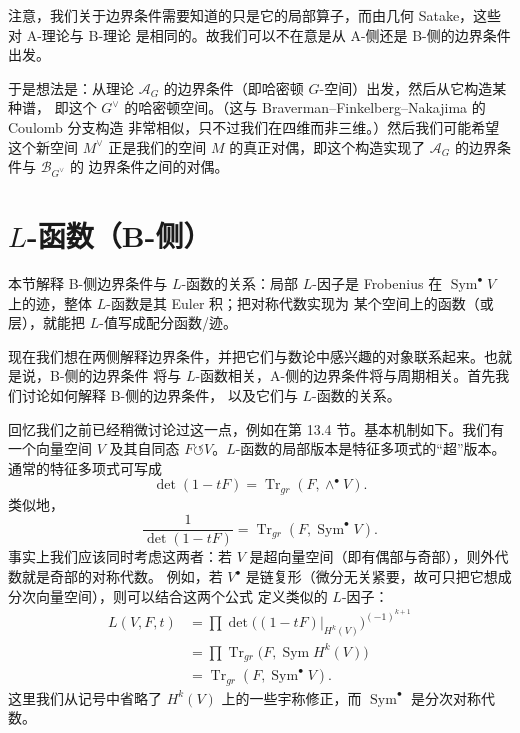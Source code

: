注意，我们关于边界条件需要知道的只是它的局部算子，而由几何 Satake，这些对 A-理论与 B-理论
是相同的。故我们可以不在意是从 A-侧还是 B-侧的边界条件出发。

于是想法是：从理论 $\mathcal A_G$ 的边界条件（即哈密顿 $G$-空间）出发，然后从它构造某种谱，
即这个 $G^{\vee}$ 的哈密顿空间。（这与 Braverman--Finkelberg--Nakajima 的 Coulomb 分支构造
非常相似，只不过我们在四维而非三维。）然后我们可能希望这个新空间 $M^{\vee}$ 正是我们的空间
$M$ 的真正对偶，即这个构造实现了 $\mathcal A_G$ 的边界条件与 $\mathcal B_{G^{\vee}}$ 的
边界条件之间的对偶。


\section{$L$-函数（B-侧）}

\begin{sectionkey}
本节解释 B-侧边界条件与 $L$-函数的关系：局部 $L$-因子是 Frobenius 在
$\operatorname{Sym}^{\bullet}V$ 上的迹，整体 $L$-函数是其 Euler 积；把对称代数实现为
某个空间上的函数（或层），就能把 $L$-值写成配分函数/迹。
\end{sectionkey}

现在我们想在两侧解释边界条件，并把它们与数论中感兴趣的对象联系起来。也就是说，B-侧的边界条件
将与 $L$-函数相关，A-侧的边界条件将与周期相关。首先我们讨论如何解释 B-侧的边界条件，
以及它们与 $L$-函数的关系。

回忆我们之前已经稍微讨论过这一点，例如在第 13.4 节。基本机制如下。我们有一个向量空间 $V$
及其自同态 $F\circlearrowleft V$。$L$-函数的局部版本是特征多项式的“超”版本。通常的特征多项式可写成
\begin{equation}\tag{17.12}\label{eq:17.12}
\det(1-tF)=\operatorname{Tr}_{gr}(F,\wedge^{\bullet}V).
\end{equation}
类似地，
\begin{equation}\tag{17.13}\label{eq:17.13}
\frac{1}{\det(1-tF)}=\operatorname{Tr}_{gr}(F,\operatorname{Sym}^{\bullet}V).
\end{equation}
事实上我们应该同时考虑这两者：若 $V$ 是超向量空间（即有偶部与奇部），则外代数就是奇部的对称代数。
例如，若 $V^{\bullet}$ 是链复形（微分无关紧要，故可只把它想成分次向量空间），则可以结合这两个公式
定义类似的 $L$-因子：
\begin{align}
L(V,F,t)&=\prod\det\bigl((1-tF)|_{H^k(V)}\bigr)^{(-1)^{k+1}}\tag{17.14}\label{eq:17.14}\\
&=\prod\operatorname{Tr}_{gr}\bigl(F,\operatorname{Sym}H^k(V)\bigr)\tag{17.15}\label{eq:17.15}\\
&=\operatorname{Tr}_{gr}(F,\operatorname{Sym}^{\bullet}V).\tag{17.16}\label{eq:17.16}
\end{align}
这里我们从记号中省略了 $H^k(V)$ 上的一些宇称修正，而 $\operatorname{Sym}^{\bullet}$ 是分次对称代数。

